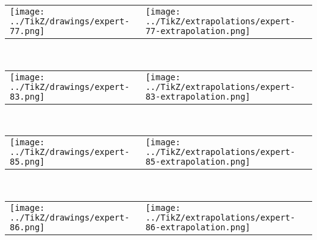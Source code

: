             \begin{tabular}{ll}
    \texttt{[image: ../TikZ/drawings/expert-77.png]}&
    \texttt{[image: ../TikZ/extrapolations/expert-77-extrapolation.png]}
    \end{tabular}        
            \\

            \begin{tabular}{ll}
    \texttt{[image: ../TikZ/drawings/expert-83.png]}&
    \texttt{[image: ../TikZ/extrapolations/expert-83-extrapolation.png]}
    \end{tabular}        
            \\

            \begin{tabular}{ll}
    \texttt{[image: ../TikZ/drawings/expert-85.png]}&
    \texttt{[image: ../TikZ/extrapolations/expert-85-extrapolation.png]}
    \end{tabular}        
            \\

            \begin{tabular}{ll}
    \texttt{[image: ../TikZ/drawings/expert-86.png]}&
    \texttt{[image: ../TikZ/extrapolations/expert-86-extrapolation.png]}
    \end{tabular}        
            
